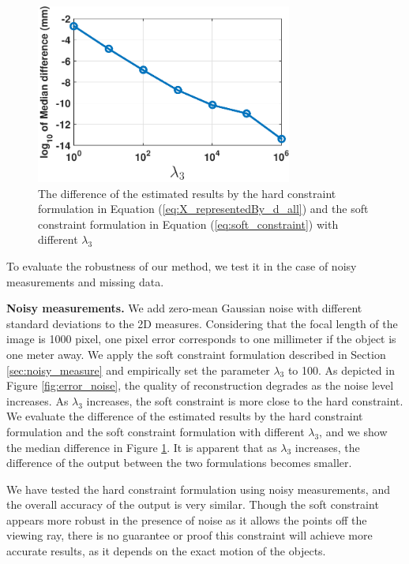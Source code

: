 \begin{figure}
\centering
\includegraphics[width=0.75\textwidth]{chapter5/resource/different_lambda.pdf}
\caption[Different between the hard constraint and the soft constraint parameterizations.]{The difference of the estimated results by the hard constraint formulation in Equation (\ref{eq:X_representedBy_d_all}) and the soft constraint formulation in Equation (\ref{eq:soft_constraint}) with different $\lambda_3$} 
\label{fig:soft_hard_diff}
\end{figure}

To evaluate the robustness of our method, we test it in the case of noisy measurements and missing data.

\textbf{Noisy measurements.} We add zero-mean Gaussian noise with different standard deviations to the 2D measures. Considering that the focal length of the image is 1000 pixel, one pixel error corresponds to one millimeter if the object is one meter away.
We apply the soft constraint formulation described in Section \ref{sec:noisy_measure} and empirically set the parameter $\lambda_3$ to 100. As depicted in Figure \ref{fig:error_noise}, the quality of reconstruction degrades as the noise level increases. As $\lambda_3$ increases, the soft constraint is more close to the hard constraint. %
We evaluate the difference of the estimated results by the hard constraint formulation and the soft constraint formulation with different $\lambda_3$, and we show the median difference in Figure \ref{fig:soft_hard_diff}. It is apparent that as $\lambda_3$ increases, the difference of the output between the two formulations becomes smaller.

We have tested the hard constraint formulation using noisy measurements, and the overall accuracy of the output is very similar. Though the soft constraint appears more robust in the presence of noise as it allows the points off the viewing ray, there is no guarantee or proof this constraint will achieve more accurate results, as it depends on the exact motion of the objects.


